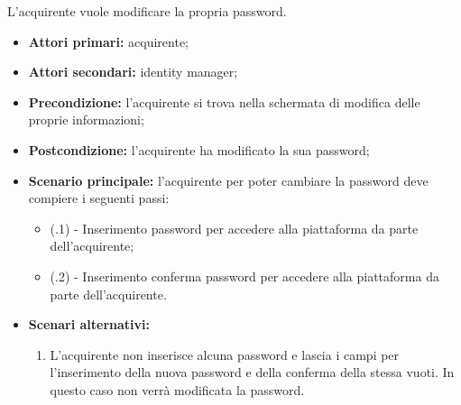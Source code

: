 L'acquirente vuole modificare la propria password.
\begin{itemize}
    \item \textbf{Attori primari:} acquirente;
    \item \textbf{Attori secondari:} identity manager;
    \item \textbf{Precondizione:} l'acquirente si trova nella schermata di modifica delle proprie informazioni;
    \item \textbf{Postcondizione:} l'acquirente ha modificato la sua password;
    \item \textbf{Scenario principale:} l'acquirente per poter cambiare la password deve compiere i seguenti passi:
    \begin{itemize}
        \item (\actualSubUC.1) - Inserimento password per accedere alla piattaforma da parte dell'acquirente;
        \item (\actualSubUC.2) - Inserimento conferma password per accedere alla piattaforma da parte dell'acquirente.
    \end{itemize}
    \item \textbf{Scenari alternativi:}
    \begin{enumerate}[label=\lett]
    	\item L'acquirente non inserisce alcuna password e lascia i campi per l'inserimento della nuova password e della conferma della stessa vuoti. In questo caso non verrà modificata la password.
    \end{enumerate}
\end{itemize}

\resetSubSubUC

